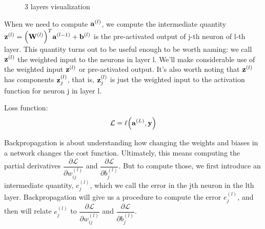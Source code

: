 \documentclass[14pt, a4paper]{article}
\numberwithin{equation}{section}
\numberwithin{algorithm}{section}
\numberwithin{figure}{section}
\begin{document}
\begin{figure}[h!]
{
  }
  \caption{3 layers visualization}
\end{figure}

When we need to compute $\bold{a}^{(l)}$, we compute the intermediate quantity $\bold{z}^{(l)}=\Big(\bold{W}^{(l)}\Big)^T\bold{a}^{(l-1)} + \bold{b}^{(l)}$ is the pre-activated output of j-th neuron of l-th layer.
This quantity turns out to be useful enough to be worth naming: we call $\bold{z}^{(l)}$ the weighted input to the neurons in layer l. 
We'll make considerable use of the weighted input $\bold{z}^{(l)}$ or pre-activated output.
It's also worth noting that $\bold{z}^{(l)}$ has components $\bold{z}_j^{(l)}$, that is, $\bold{z}_j^{(l)}$ is just the weighted input to the activation function for neuron j in layer l.

Loss function:
\begin{equation}
	  \mathcal{L} = \ell\Big(\bold{a}^{(L)}, \bold{y} \Big)
\end{equation}

Backpropagation is about understanding how changing the weights and biases in a network changes the cost function. 
Ultimately, this means computing the partial derivatives $\dfrac{\partial \mathcal{L}}{\partial w_{ij}^{(l)}}$ and $\dfrac{\partial \mathcal{L}}{\partial b_{j}^{(l)}}$. 
But to compute those, we first introduce an intermediate quantity, $e_j^{(l)}$, which we call the error in the jth neuron in the lth layer. 
Backpropagation will give us a procedure to compute the error $e_j^{(l)}$, and then will relate $e_j^{(l)}$ to $\dfrac{\partial \mathcal{L}}{\partial w_{ij}^{(l)}}$ and $\dfrac{\partial \mathcal{L}}{\partial b_{j}^{(l)}}$.
\end{document}
